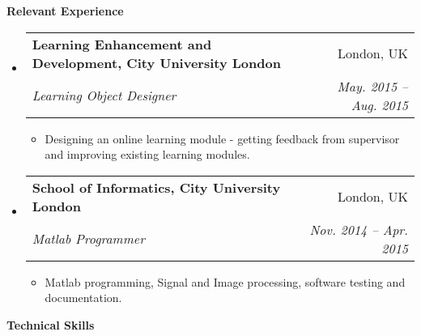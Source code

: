 \documentclass[letterpaper,11pt]{article}
\makeatletter
\newcommand{\resitem}[1]{\item #1 \vspace{-2pt}}
\newcommand{\resheading}[1]{{\large \colorbox{mygrey}{\begin{minipage}{\textwidth}{\textbf{#1 \vphantom{p\^{E}}}}\end{minipage}}}}
\newcommand{\ressubheading}[4]{
\begin{tabular*}{6.5in}{l@{\extracolsep{\fill}}r}
		\textbf{#1} & #2 \\
		\textit{#3} & \textit{#4} \\
\end{tabular*}\vspace{-6pt}}
\makeatother
\begin{document}
\resheading{Relevant Experience}
	\begin{itemize}
	\item 
			\ressubheading{Learning Enhancement and Development,	City University London}{London, UK}{Learning Object Designer}{May. 2015 -- Aug. 2015}
			{ \footnotesize
				\begin{itemize}
					\resitem{Designing an online learning module - getting feedback from supervisor and improving existing learning modules.}				
				\end{itemize}
			}
				
	\item 
			\ressubheading{School of Informatics, City University London}{London, UK}{Matlab Programmer}{Nov. 2014 -- Apr. 2015}
			{ \footnotesize
				\begin{itemize}
					\resitem{Matlab programming, Signal and Image processing, software testing and documentation.}				
				\end{itemize}
			}

	\end{itemize}  
\resheading{Technical Skills}
\end{document}
